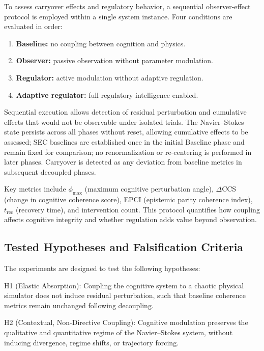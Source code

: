 \documentclass[12pt,a4paper]{article}
\begin{document}
To assess carryover effects and regulatory behavior, a sequential observer-effect protocol is employed within a single system instance. Four conditions are evaluated in order:

\begin{enumerate}
    \item \textbf{Baseline:} no coupling between cognition and physics.
    \item \textbf{Observer:} passive observation without parameter modulation.
    \item \textbf{Regulator:} active modulation without adaptive regulation.
    \item \textbf{Adaptive regulator:} full regulatory intelligence enabled.
\end{enumerate}

Sequential execution allows detection of residual perturbation and cumulative effects that would not be observable under isolated trials. The Navier--Stokes state persists across all phases without reset, allowing cumulative effects to be assessed; SEC baselines are established once in the initial Baseline phase and remain fixed for comparison; no renormalization or re-centering is performed in later phases. Carryover is detected as any deviation from baseline metrics in subsequent decoupled phases.

Key metrics include $\phi_{\max}$ (maximum cognitive perturbation angle), $\Delta$CCS (change in cognitive coherence score), EPCI (epistemic parity coherence index), $t_{\text{rec}}$ (recovery time), and intervention count. This protocol quantifies how coupling affects cognitive integrity and whether regulation adds value beyond observation.

\subsection{Tested Hypotheses and Falsification Criteria}

The experiments are designed to test the following hypotheses:

H1 (Elastic Absorption): Coupling the cognitive system to a chaotic physical simulator does not induce residual perturbation, such that baseline coherence metrics remain unchanged following decoupling.

H2 (Contextual, Non-Directive Coupling): Cognitive modulation preserves the qualitative and quantitative regime of the Navier--Stokes system, without inducing divergence, regime shifts, or trajectory forcing.
\end{document}
